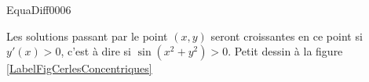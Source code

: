 \begin{corrige}{EquaDiff0006}

Les solutions passant par le point $(x,y)$ seront croissantes en ce point si $y'(x)>0$, c'est à dire si $\sin(x^2+y^2)>0$. Petit dessin à la figure \ref{LabelFigCerlesConcentriques}
\newcommand{\CaptionFigCerlesConcentriques}{Les zones achurées sont là où les solutions sont croissantes.}


\end{corrige}
